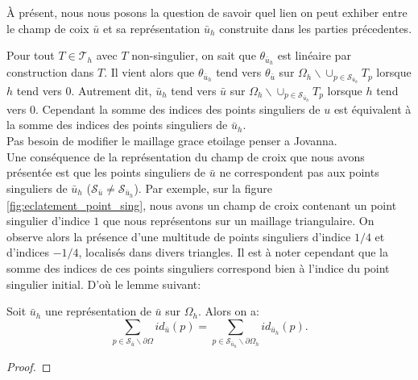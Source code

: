 À présent, nous nous posons la question de savoir quel lien on peut exhiber entre le champ de coix $\bar{u}$ et sa représentation $\bar{u}_h$ construite dans les parties précedentes.

Pour tout $T\in\mathcal{T}_h$ avec $T$ non-singulier, on sait que $\theta_{\bar{u}_h}$ est linéaire par construction dans $T$. Il vient alors que $\theta_{\bar{u}_h}$ tend vers $\theta_{\bar{u}}$ sur $\Omega_h\backslash\cup_{p\in\mathcal{S}_{\bar{u}_h}}T_p$ lorsque $h$ tend vers $0$. Autrement dit, $\bar{u}_h$ tend vers $\bar{u}$ sur $\Omega_h\backslash\cup_{p\in\mathcal{S}_{\bar{u}_h}}T_p$ lorsque $h$ tend vers $0$. \color{red} Cependant la somme des indices des points singuliers de $u$ est équivalent à la somme des indices des points singuliers de $\bar{u}_h$.\\
Pas besoin de modifier le maillage grace etoilage penser a Jovanna\color{black}.
\[\]
Une conséquence de la représentation du champ de croix que nous avons présentée est que les points singuliers de $\bar{u}$ ne correspondent pas aux points singuliers de $\bar{u}_h$ ($\mathcal{S}_{\bar{u}}\neq\mathcal{S}_{\bar{u}_h}$). Par exemple, sur la figure \ref{fig:eclatement_point_sing}, nous avons un champ de croix contenant un point singulier d'indice $1$ que nous représentons sur un maillage triangulaire. On observe alors la présence d'une multitude de points singuliers d'indice $1/4$ et d'indices $-1/4$, localisés dans divers triangles. Il est à noter cependant que la somme des indices de ces points singuliers correspond bien à l'indice du point singulier initial. D'où le lemme suivant:

\begin{lemma}
 Soit $\bar{u}_h$ une représentation de $\bar{u}$ sur $\Omega_h$. Alors on a:
 $$
 \sum_{p\in\mathcal{S}_{\bar{u}}\backslash\partial\Omega}id_{\bar{u}}(p)=\sum_{p\in\mathcal{S}_{\bar{u}_h}\backslash\partial\Omega_h}id_{\bar{u}_h}(p).
 $$
\end{lemma}

\begin{proof}

\end{proof}


